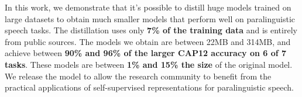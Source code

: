 In this work, we demonstrate that it's possible to distill huge models trained on large datasets to obtain much smaller models that perform well on paralinguistic speech tasks.
The distillation uses only \textbf{7\% of the training data} and is entirely from public sources. The models we obtain are between 22MB and 314MB, and achieve between \textbf{90\% and 96\% of the larger CAP12 accuracy on 6 of 7 tasks}. These models are between \textbf{1\% and 15\% the size} of the original model. We release the model to allow the research community to benefit from the practical applications of self-supervised representations for paralinguistic speech.